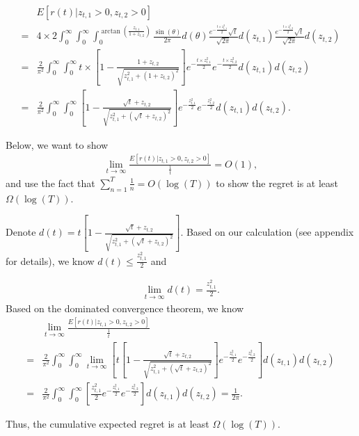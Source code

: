 \begin{align}
&E[r(t)| z_{t,1}>0, z_{t,2}>0] \nonumber \\
=& 4\times 2 \int_{0}^{\infty} \int_{0}^{\infty} \int_{0}^{\arctan\left(\frac{z_{t,1}}{1+z_{t,2}}\right)}\frac{\sin(\theta)}{2\pi}d(\theta)\frac{e^{-\frac{t \times z_{t,1}^2}{2}}\sqrt{t}}{\sqrt{2\pi}}d(z_{t,1})\frac{e^{-\frac{t \times z_{t,2}^2}{2}}\sqrt{t}}{\sqrt{2\pi}}d(z_{t,2}) \nonumber \\
=& \frac{2}{\pi^2}\int_{0}^{\infty} \int_{0}^{\infty}t\times \left[1-\frac{1+z_{t,2}}{\sqrt{z_{t,1}^2+(1+z_{t,2})^2}}\right]e^{-\frac{t \times z_{t,1}^2}{2}}e^{-\frac{t \times z_{t,2}^2}{2}}d(z_{t,1})d(z_{t,2}) \nonumber \\
=& \frac{2}{\pi^2}\int_{0}^{\infty} \int_{0}^{\infty} \left[1-\frac{\sqrt{t}+z_{t,2}}{\sqrt{z_{t,1}^2+(\sqrt{t}+z_{t,2})^2}}\right]e^{-\frac{z_{t,1}^2}{2}}e^{-\frac{z_{t,2}^2}{2}}d(z_{t,1})d(z_{t,2}). \nonumber 
\end{align}

Below, we want to show 
\begin{align}
\lim_{t\rightarrow\infty}\frac{E[r(t)| z_{t,1}>0, z_{t,2}>0]}{\frac{1}{t}} = O(1), \nonumber
\end{align}
and use the fact that $\sum_{n=1}^{T}\frac{1}{n}=O(\log(T))$ to show the regret is at least $\Omega(\log(T))$.

Denote $d(t)=t\left[1-\frac{\sqrt{t}+z_{t,2}}{\sqrt{z_{t,1}^2+(\sqrt{t}+z_{t,2})^2}}\right]$. Based on our calculation (see appendix for details), we know $d(t)\leq \frac{z_{t,1}^2}{2}$ and

\begin{align}
\lim_{t\rightarrow \infty} d(t)=\frac{z_{t,1}^2}{2}. \label{ex:limit}
\end{align}
Based on the dominated convergence theorem, we know
\begin{align}
&\lim_{t\rightarrow \infty}\frac{E[r(t)| z_{t,1}>0, z_{t,2}>0]}{\frac{1}{t}} \nonumber \\
=& \frac{2}{\pi^2}\int_{0}^{\infty} \int_{0}^{\infty}\lim_{t\rightarrow \infty}\left[ t\left[1-\frac{\sqrt{t}+z_{t,2}}{\sqrt{z_{t,1}^2+(\sqrt{t}+z_{t,2})^2}}\right]e^{-\frac{z_{t,1}^2}{2}}e^{-\frac{z_{t,2}^2}{2}}\right]d(z_{t,1})d(z_{t,2}) \nonumber  \\
=&\frac{2}{\pi^2}\int_{0}^{\infty} \int_{0}^{\infty}\left[ \frac{z_{t,1}^2}{2}e^{-\frac{z_{t,1}^2}{2}}e^{-\frac{z_{t,2}^2}{2}}\right]d(z_{t,1})d(z_{t,2}) = \frac{1}{2\pi}. \nonumber
\end{align}


Thus, the cumulative expected regret is at least $\Omega(\log(T))$.




